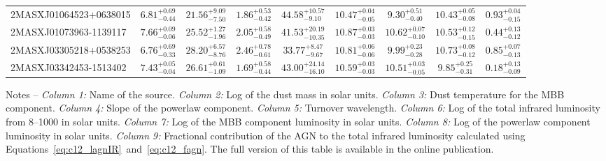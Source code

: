 \documentclass[fleqn, usenatbib]{mnras}
\begin{document}
\begin{table}
\begin{threeparttable}
\begin{tabular}{lcccccccc}
2MASXJ01064523+0638015 & $6.81_{-0.44}^{+0.69}$ & $21.56_{-7.50}^{+9.09}$ & $1.86_{-0.42}^{+0.53}$ &$44.58_{-9.10}^{+10.57}$ & $10.47_{-0.05}^{+0.04}$ & $9.30_{-0.40}^{+0.51}$ & $10.43_{-0.08}^{+0.05}$ & $0.93_{-0.15}^{+0.04}$ \\
2MASXJ01073963-1139117 & $7.66_{-0.06}^{+0.09}$ & $25.52_{-1.96}^{+1.27}$ & $2.05_{-0.49}^{+0.58}$ &$41.53_{-10.35}^{+20.19}$ & $10.87_{-0.03}^{+0.03}$ & $10.62_{-0.10}^{+0.07}$ & $10.53_{-0.15}^{+0.12}$ & $0.44_{-0.12}^{+0.13}$ \\
2MASXJ03305218+0538253 & $6.76_{-0.33}^{+0.69}$ & $28.20_{-8.76}^{+6.57}$ & $2.46_{-0.61}^{+0.78}$ &$33.77_{-9.67}^{+8.47}$ & $10.81_{-0.06}^{+0.06}$ & $9.99_{-0.28}^{+0.23}$ & $10.73_{-0.12}^{+0.08}$ & $0.85_{-0.13}^{+0.07}$ \\
2MASXJ03342453-1513402 & $7.43_{-0.04}^{+0.05}$ & $26.61_{-1.09}^{+0.61}$ & $1.69_{-0.44}^{+0.58}$ &$43.00_{-16.10}^{+24.14}$ & $10.59_{-0.03}^{+0.03}$ & $10.51_{-0.05}^{+0.03}$ & $9.85_{-0.31}^{+0.25}$ & $0.18_{-0.09}^{+0.13}$ \\\bottomrule
\end{tabular}
\begin{tablenotes}
\item Notes -- \textit{Column 1:} Name of the source. \textit{Column 2:} Log of the dust mass in solar units. \textit{Column 3:} Dust temperature for the MBB component. \textit{Column 4:} Slope of the powerlaw component. \textit{Column 5:} Turnover wavelength. \textit{Column 6:} Log of the total infrared luminosity from 8--1000 \micron{} in solar units. \textit{Column 7:} Log of the MBB component luminosity in solar units. \textit{Column 8:} Log of the powerlaw component luminosity in solar units. \textit{Column 9:} Fractional contribution of the AGN to the total infrared luminosity calculated using Equations~\ref{eq:c12_lagnIR}~and~\ref{eq:c12_fagn}. The full version of this table is available in the online publication.
\end{tablenotes}
\end{threeparttable}
\end{table}
\end{document}
